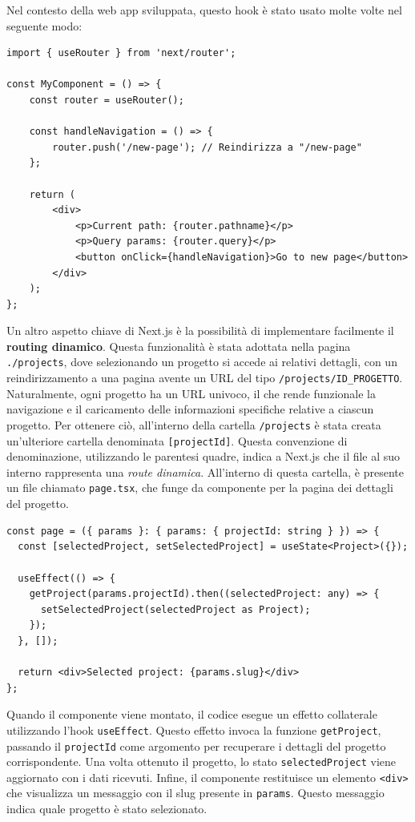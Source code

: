 \documentclass[target=bach,aauheader=,style=]{thud}
\begin{document}
\noindent Nel contesto della web app sviluppata, questo hook è stato usato molte volte nel seguente modo:

\begin{lstlisting}[caption=\texttt{useRouter} per la navigazione tra url]
import { useRouter } from 'next/router';

const MyComponent = () => {
    const router = useRouter();

    const handleNavigation = () => {
        router.push('/new-page'); // Reindirizza a "/new-page"
    };

    return (
        <div>
            <p>Current path: {router.pathname}</p>
            <p>Query params: {router.query}</p>
            <button onClick={handleNavigation}>Go to new page</button>
        </div>
    );
};
\end{lstlisting}

\noindent Un altro aspetto chiave di Next.js è la possibilità di implementare facilmente il \textbf{routing dinamico}. Questa funzionalità è stata adottata nella pagina \texttt{./projects}, dove selezionando un progetto si accede ai relativi dettagli, con un reindirizzamento a una pagina avente un URL del tipo \texttt{/projects/ID\_PROGETTO}. Naturalmente, ogni progetto ha un URL univoco, il che rende funzionale la navigazione e il caricamento delle informazioni specifiche relative a ciascun progetto. Per ottenere ciò, all'interno della cartella \texttt{/projects} è stata creata un'ulteriore cartella denominata \texttt{[projectId]}. Questa convenzione di denominazione, utilizzando le parentesi quadre, indica a Next.js che il file al suo interno rappresenta una \textit{route dinamica}. All'interno di questa cartella, è presente un file chiamato \texttt{page.tsx}, che funge da componente per la pagina dei dettagli del progetto.

\begin{lstlisting}[caption=Routing dinamico con Next.js]
const page = ({ params }: { params: { projectId: string } }) => {
  const [selectedProject, setSelectedProject] = useState<Project>({});
  
  useEffect(() => {
    getProject(params.projectId).then((selectedProject: any) => {
      setSelectedProject(selectedProject as Project);
    });
  }, []);

  return <div>Selected project: {params.slug}</div>
};
\end{lstlisting}

\noindent Quando il componente viene montato, il codice esegue un effetto collaterale utilizzando l'hook \texttt{useEffect}. Questo effetto invoca la funzione \texttt{getProject}, passando il \texttt{projectId} come argomento per recuperare i dettagli del progetto corrispondente. Una volta ottenuto il progetto, lo stato \texttt{selectedProject} viene aggiornato con i dati ricevuti. Infine, il componente restituisce un elemento \texttt{<div>} che visualizza un messaggio con il slug presente in \texttt{params}. Questo messaggio indica quale progetto è stato selezionato. 
\end{document}
